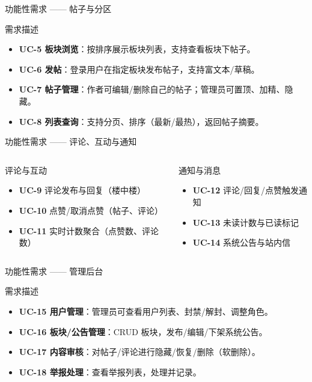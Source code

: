 \documentclass[aspectratio=169,UTF8]{ctexbeamer}
\begin{document}
\begin{frame}{功能性需求 —— 帖子与分区}
    \begin{block}{需求描述}
        \begin{itemize}
            \item \textbf{UC-5 板块浏览}：按排序展示板块列表，支持查看板块下帖子。
            \item \textbf{UC-6 发帖}：登录用户在指定板块发布帖子，支持富文本/草稿。
            \item \textbf{UC-7 帖子管理}：作者可编辑/删除自己的帖子；管理员可置顶、加精、隐藏。
            \item \textbf{UC-8 列表查询}：支持分页、排序（最新/最热），返回帖子摘要。
        \end{itemize}
    \end{block}
\end{frame}

\begin{frame}{功能性需求 —— 评论、互动与通知}
    \begin{columns}
        \begin{block}{评论与互动}
            \begin{itemize}
                \item \textbf{UC-9} 评论发布与回复（楼中楼）
                \item \textbf{UC-10} 点赞/取消点赞（帖子、评论）
                \item \textbf{UC-11} 实时计数聚合（点赞数、评论数）
            \end{itemize}
        \end{block}
        \begin{block}{通知与消息}
            \begin{itemize}
                \item \textbf{UC-12} 评论/回复/点赞触发通知
                \item \textbf{UC-13} 未读计数与已读标记
                \item \textbf{UC-14} 系统公告与站内信
            \end{itemize}
        \end{block}
    \end{columns}
\end{frame}

\begin{frame}{功能性需求 —— 管理后台}
    \begin{block}{需求描述}
        \begin{itemize}
            \item \textbf{UC-15 用户管理}：管理员可查看用户列表、封禁/解封、调整角色。
            \item \textbf{UC-16 板块/公告管理}：CRUD 板块，发布/编辑/下架系统公告。
            \item \textbf{UC-17 内容审核}：对帖子/评论进行隐藏/恢复/删除（软删除）。
            \item \textbf{UC-18 举报处理}：查看举报列表，处理并记录。
        \end{itemize}
    \end{block}
\end{frame}
\end{document}
